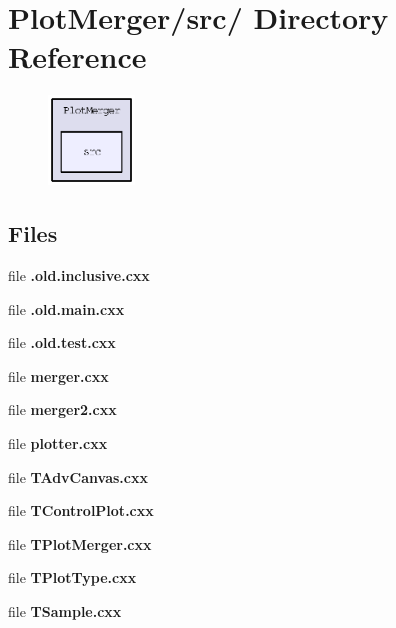 \section{Plot\-Merger/src/ Directory Reference}
\label{dir_43d46fcaa7dc9b2667d6f38f4e2adfdb}


\begin{figure}[H]
\begin{center}
\leavevmode
\includegraphics[width=65pt]{dir_43d46fcaa7dc9b2667d6f38f4e2adfdb_dep}
\end{center}
\end{figure}
\subsection*{Files}
\begin{CompactItemize}
\item 
file \textbf{.old.inclusive.cxx}
\item 
file \textbf{.old.main.cxx}
\item 
file \textbf{.old.test.cxx}
\item 
file \textbf{merger.cxx}
\item 
file \textbf{merger2.cxx}
\item 
file \textbf{plotter.cxx}
\item 
file \textbf{TAdv\-Canvas.cxx}
\item 
file \textbf{TControl\-Plot.cxx}
\item 
file \textbf{TPlot\-Merger.cxx}
\item 
file \textbf{TPlot\-Type.cxx}
\item 
file \textbf{TSample.cxx}
\end{CompactItemize}
